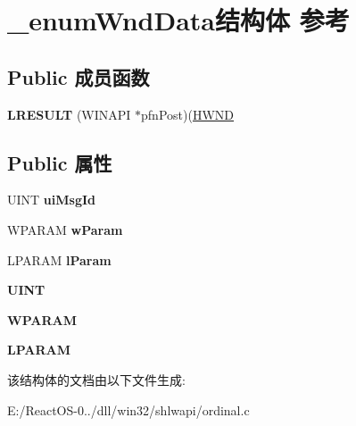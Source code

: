 \hypertarget{struct__enum_wnd_data}{}\section{\+\_\+enum\+Wnd\+Data结构体 参考}
\label{struct__enum_wnd_data}
\subsection*{Public 成员函数}
\begin{DoxyCompactItemize}
\item 
\mbox{\label{struct__enum_wnd_data_a0e3d22fd9f3c32f3d2ca4d050ffa1b3d}} 
{\bfseries L\+R\+E\+S\+U\+LT} (W\+I\+N\+A\+PI $\ast$pfn\+Post)(\hyperlink{interfacevoid}{H\+W\+ND}
\end{DoxyCompactItemize}
\subsection*{Public 属性}
\begin{DoxyCompactItemize}
\item 
\mbox{\label{struct__enum_wnd_data_a81e32daa66cea98bb3dbdfcc859be781}} 
U\+I\+NT {\bfseries ui\+Msg\+Id}
\item 
\mbox{\label{struct__enum_wnd_data_a288e476ed2fd2a6dd63e98952bee66d7}} 
W\+P\+A\+R\+AM {\bfseries w\+Param}
\item 
\mbox{\label{struct__enum_wnd_data_a6f1503e31e368ddf146e36adbd8056ed}} 
L\+P\+A\+R\+AM {\bfseries l\+Param}
\item 
\mbox{\label{struct__enum_wnd_data_a3201b2e3a44c1ac35484b3380ac496a4}} 
{\bfseries U\+I\+NT}
\item 
\mbox{\label{struct__enum_wnd_data_aec8a44c364a4c11be571433adc34d74d}} 
{\bfseries W\+P\+A\+R\+AM}
\item 
\mbox{\label{struct__enum_wnd_data_ae77e5e32610ae7c0890731e535f91bb5}} 
{\bfseries L\+P\+A\+R\+AM}
\end{DoxyCompactItemize}


该结构体的文档由以下文件生成\+:\begin{DoxyCompactItemize}
\item 
E\+:/\+React\+O\+S-\/0../dll/win32/shlwapi/ordinal.\+c\end{DoxyCompactItemize}
